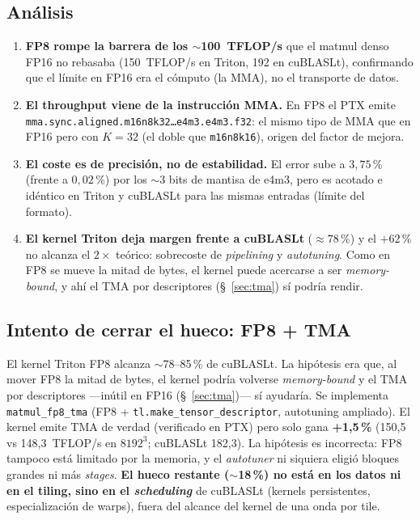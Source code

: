 \subsection{Análisis}

\begin{enumerate}
  \item \textbf{FP8 rompe la barrera de los $\sim$100~TFLOP/s} que el matmul denso FP16
  no rebasaba (150~TFLOP/s en Triton, 192 en cuBLASLt), confirmando que el límite en
  FP16 era el cómputo (la MMA), no el transporte de datos.
  \item \textbf{El throughput viene de la instrucción MMA.} En FP8 el PTX emite
  \texttt{mma.sync.aligned.m16n8k32\dots e4m3.e4m3.f32}: el mismo tipo de MMA que en
  FP16 pero con $K=32$ (el doble que \texttt{m16n8k16}), origen del factor de mejora.
  \item \textbf{El coste es de precisión, no de estabilidad.} El error sube a
  $3{,}75\,\%$ (frente a $0{,}02\,\%$) por los $\sim$3 bits de mantisa de e4m3, pero es
  acotado e idéntico en Triton y cuBLASLt para las mismas entradas (límite del formato).
  \item \textbf{El kernel Triton deja margen frente a cuBLASLt} ($\approx 78\,\%$) y el
  $+62\,\%$ no alcanza el $2\times$ teórico: sobrecoste de \emph{pipelining} y
  \emph{autotuning}. Como en FP8 se mueve la mitad de bytes, el kernel puede acercarse a
  ser \emph{memory-bound}, y ahí el TMA por descriptores (§~\ref{sec:tma}) sí podría rendir.
\end{enumerate}

\subsection{Intento de cerrar el hueco: FP8 + TMA}

El kernel Triton FP8 alcanza $\sim$78--85\,\% de cuBLASLt. La hipótesis era que, al mover
FP8 la mitad de bytes, el kernel podría volverse \emph{memory-bound} y el TMA por
descriptores ---inútil en FP16 (§~\ref{sec:tma})--- sí ayudaría. Se implementa
\texttt{matmul\_fp8\_tma} (FP8 + \texttt{tl.make\_tensor\_descriptor}, autotuning ampliado).
El kernel emite TMA de verdad (verificado en PTX) pero solo gana \textbf{+1{,}5\,\%}
(150{,}5 vs 148{,}3~TFLOP/s en $8192^3$; cuBLASLt 182{,}3). La hipótesis es incorrecta:
FP8 tampoco está limitado por la memoria, y el \emph{autotuner} ni siquiera eligió bloques
grandes ni más \emph{stages}. \textbf{El hueco restante ($\sim$18\,\%) no está en los datos
ni en el tiling, sino en el \emph{scheduling}} de cuBLASLt (kernels persistentes,
especialización de warps), fuera del alcance del kernel de una onda por tile.

